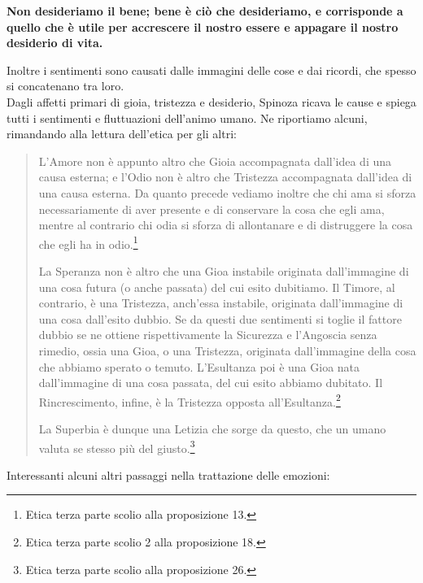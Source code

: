 \textbf{Non desideriamo il bene; bene è ciò che desideriamo, e corrisponde a quello che è utile per accrescere il nostro essere e appagare il nostro desiderio di vita.}

Inoltre i sentimenti sono causati dalle immagini delle cose e dai ricordi, che spesso si concatenano tra loro.\\
Dagli affetti primari di gioia, tristezza e desiderio, Spinoza ricava le cause e spiega tutti i sentimenti e fluttuazioni dell'animo umano. Ne riportiamo alcuni, rimandando alla lettura dell'etica per gli altri:

\begin{quotation}
	\small L’Amore non è appunto altro che Gioia accompagnata dall’idea di una causa
	esterna; e l’Odio non è altro che Tristezza accompagnata dall’idea di una causa esterna.
	Da quanto precede vediamo inoltre che chi ama si sforza necessariamente di aver presente
	e di conservare la cosa che egli ama, mentre al contrario chi odia si sforza di allontanare e
	di distruggere la cosa che egli ha in odio.\footnote{Etica terza parte scolio alla proposizione 13.}
	
	La Speranza non è altro che una Gioa instabile originata dall’immagine di una cosa futura (o anche passata) del cui esito dubitiamo. Il Timore, al contrario, è una Tristezza,
	anch’essa instabile, originata dall’immagine di una cosa dall’esito dubbio. Se da questi due
	sentimenti si toglie il fattore dubbio se ne ottiene rispettivamente la Sicurezza e l’Angoscia
	senza rimedio, ossia una Gioa, o una Tristezza, originata dall’immagine della cosa che
	abbiamo sperato o temuto. L'Esultanza poi è una Gioa nata dall’immagine di una cosa passata, del cui esito abbiamo dubitato. Il Rincrescimento, infine, è la Tristezza opposta all'Esultanza.\footnote{Etica terza parte scolio 2 alla proposizione 18.}
	
	La Superbia è dunque una Letizia
	che sorge da questo, che un umano valuta se stesso più del giusto.\footnote{Etica terza parte scolio alla proposizione 26.}
\end{quotation}

Interessanti alcuni altri passaggi nella trattazione delle emozioni:

